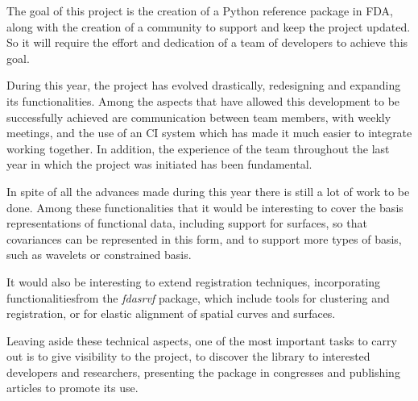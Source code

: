 The goal of this project is the creation of a Python reference package in
FDA, along with the creation of a community to
support and keep the project updated. So it will require the effort and
dedication of a team of developers to achieve this goal.

During this year, the project has evolved drastically, redesigning and expanding
its functionalities.
Among the aspects that have allowed this development to be successfully achieved
are communication between team members, with weekly meetings, and the use of
an CI system which has made it much easier to integrate working together.
In addition, the experience of the team throughout the last year in which the
project was initiated has been fundamental.

In spite of all the advances made during this year there is still a lot of work
to be done.
Among these functionalities that it would be interesting to cover the basis
representations of functional data, including support for surfaces, so that
covariances can be represented in this form, and to support more types of basis,
such as wavelets \cite{Morettin2017} or constrained basis\cite{Ramsay2005}.

It would also be interesting to extend registration techniques,
incorporating functionalitiesfrom the \textit{fdasrvf}\cite{fdasrvf} package,
which include tools for clustering and registration, or for elastic
alignment of spatial curves and surfaces.

Leaving aside these technical aspects, one of the most important tasks to carry
out is to give visibility to the project, to discover the library to interested
developers and researchers, presenting the package in congresses and publishing
articles to promote its use.
